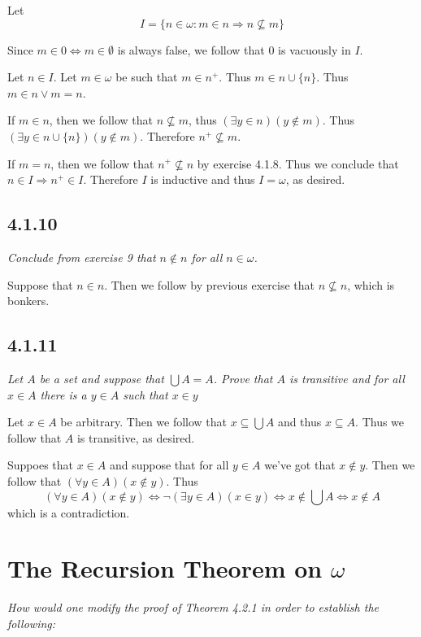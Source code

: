 \documentclass[11pt,oneside,titlepage]{book}
\DeclareMathOperator \lra {\Leftrightarrow}
\DeclareMathOperator \ra {\Rightarrow}
\begin{document}
Let
$$I = \{n \in \omega: m \in n \ra n \not \subseteq m\}$$

Since $m \in 0 \lra m \in \emptyset$ is always false, we follow that $0$ is vacuously in $I$.

Let $n \in I$. Let $m \in \omega$ be such that $m \in n^+$.
Thus $m \in n \cup \{n\}$. Thus $m \in n \lor m = n$.

If $m \in n$, then we follow that $n \not \subseteq m$, thus $(\exists y \in n)(y \notin m)$.
Thus $(\exists y \in n \cup \{n\})(y \notin m)$. Therefore $n^+ \not \subseteq m$.

If $m = n$, then we follow that $n^+ \not \subseteq n$ by exercise 4.1.8.
Thus we conclude that $n \in I \ra n^+ \in I$. Therefore $I$ is inductive and thus $I = \omega$,
as desired.

\subsection*{4.1.10}

\textit{Conclude from exercise 9 that $n \notin n$ for all $n \in \omega$.}

Suppose that $n \in n$. Then we follow by previous exercise
that $n \not \subseteq n$, which is bonkers.

\subsection*{4.1.11}

\textit{Let $A$ be a set and suppose that $\bigcup A = A$. Prove that $A$ is transitive
  and for all $x \in A$ there is a $y \in A$ such that $x \in y$}

Let $x \in A$ be arbitrary.
Then we follow that $x \subseteq \bigcup A$ and thus $x \subseteq A$. Thus we follow that
$A$ is transitive, as desired.

Suppoes that $x \in A$ and suppose that for all $y \in A$ we've got that $x \notin y$.
Then we follow that $(\forall y \in A)(x \notin y)$. Thus
$$(\forall y \in A)(x \notin y) \lra \neg (\exists y \in A)(x \in y) \lra x \notin \bigcup A \lra
x \notin A$$
which is a contradiction.

\section{The Recursion Theorem on $\omega$}

\textit{How would one modify the proof of Theorem 4.2.1 in order to establish the
  following: }
\end{document}
